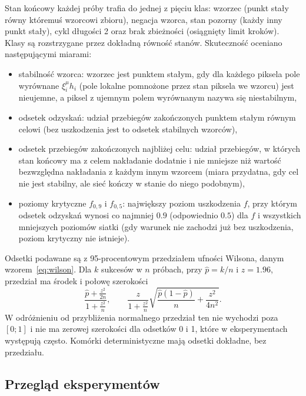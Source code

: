Stan końcowy każdej próby trafia do jednej z pięciu klas: wzorzec (punkt stały równy któremuś wzorcowi zbioru), negacja wzorca, stan pozorny (każdy inny punkt stały), cykl długości 2 oraz brak zbieżności (osiągnięty limit kroków). Klasy są rozstrzygane przez dokładną równość stanów. Skuteczność oceniano następującymi miarami:
\begin{itemize}
    \item stabilność wzorca: wzorzec jest punktem stałym, gdy dla każdego piksela pole wyrównane $\xi^\mu_i h_i$ (pole lokalne pomnożone przez stan piksela we wzorcu) jest nieujemne, a piksel z ujemnym polem wyrównanym nazywa się niestabilnym,
    \item odsetek odzyskań: udział przebiegów zakończonych punktem stałym równym celowi (bez uszkodzenia jest to odsetek stabilnych wzorców),
    \item odsetek przebiegów zakończonych najbliżej celu: udział przebiegów, w których stan końcowy ma z celem nakładanie dodatnie i nie mniejsze niż wartość bezwzględna nakładania z każdym innym wzorcem (miara przydatna, gdy cel nie jest stabilny, ale sieć kończy w stanie do niego podobnym),
    \item poziomy krytyczne $f_{0,9}$ i $f_{0,5}$: największy poziom uszkodzenia $f$, przy którym odsetek odzyskań wynosi co najmniej $\num{0.9}$ (odpowiednio $\num{0.5}$) dla $f$ i wszystkich mniejszych poziomów siatki (gdy warunek nie zachodzi już bez uszkodzenia, poziom krytyczny nie istnieje).
\end{itemize}

Odsetki podawane są z 95-procentowym przedziałem ufności Wilsona, danym wzorem~\eqref{eq:wilson}. Dla $k$ sukcesów w $n$ próbach, przy $\hat p = k/n$ i $z = \num{1.96}$, przedział ma środek i połowę szerokości
\begin{equation}
    \frac{\hat p + \frac{z^2}{2n}}{1 + \frac{z^2}{n}}, \qquad \frac{z}{1 + \frac{z^2}{n}} \sqrt{\frac{\hat p (1 - \hat p)}{n} + \frac{z^2}{4n^2}}.
    \label{eq:wilson}
\end{equation}
W odróżnieniu od przybliżenia normalnego przedział ten nie wychodzi poza $[0; 1]$ i nie ma zerowej szerokości dla odsetków 0 i 1, które w eksperymentach występują często. Komórki deterministyczne mają odsetki dokładne, bez przedziału.

\subsection{Przegląd eksperymentów}
\label{sec:eksperymenty}

